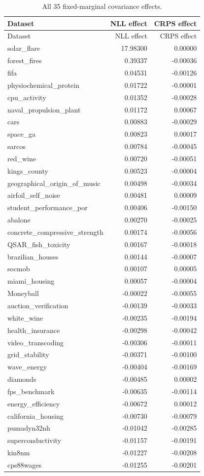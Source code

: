 \begin{longtable}{lrr}
\caption{All 35 fixed-marginal covariance effects.}\label{tab:all-effects}\\
\toprule Dataset & NLL effect & CRPS effect \\
\midrule
\endfirsthead
\toprule Dataset & NLL effect & CRPS effect \\
\midrule
\endhead
solar\_flare & 17.98300 & 0.00000 \\
forest\_fires & 0.39337 & -0.00036 \\
fifa & 0.04531 & -0.00126 \\
physiochemical\_protein & 0.01722 & -0.00001 \\
cpu\_activity & 0.01352 & -0.00028 \\
naval\_propulsion\_plant & 0.01172 & 0.00067 \\
cars & 0.00883 & -0.00029 \\
space\_ga & 0.00823 & 0.00017 \\
sarcos & 0.00784 & -0.00045 \\
red\_wine & 0.00720 & -0.00051 \\
kings\_county & 0.00523 & -0.00004 \\
geographical\_origin\_of\_music & 0.00498 & -0.00034 \\
airfoil\_self\_noise & 0.00481 & 0.00009 \\
student\_performance\_por & 0.00406 & -0.00150 \\
abalone & 0.00270 & -0.00025 \\
concrete\_compressive\_strength & 0.00174 & -0.00056 \\
QSAR\_fish\_toxicity & 0.00167 & -0.00018 \\
brazilian\_houses & 0.00144 & -0.00007 \\
socmob & 0.00107 & 0.00005 \\
miami\_housing & 0.00057 & -0.00004 \\
Moneyball & -0.00022 & -0.00055 \\
auction\_verification & -0.00139 & -0.00033 \\
white\_wine & -0.00235 & -0.00194 \\
health\_insurance & -0.00298 & -0.00042 \\
video\_transcoding & -0.00306 & -0.00011 \\
grid\_stability & -0.00371 & -0.00100 \\
wave\_energy & -0.00404 & -0.00169 \\
diamonds & -0.00485 & 0.00002 \\
fps\_benchmark & -0.00635 & -0.00114 \\
energy\_efficiency & -0.00672 & 0.00012 \\
california\_housing & -0.00730 & -0.00079 \\
pumadyn32nh & -0.01042 & -0.00285 \\
superconductivity & -0.01157 & -0.00191 \\
kin8nm & -0.01227 & -0.00208 \\
cps88wages & -0.01255 & -0.00201 \\
\bottomrule
\end{longtable}
